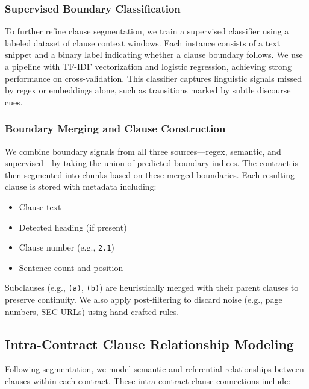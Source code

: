 \documentclass[11pt, oneside]{article}   	%
\begin{document}
\subsubsection*{Supervised Boundary Classification}

To further refine clause segmentation, we train a supervised classifier using a labeled dataset of clause context windows. Each instance consists of a text snippet and a binary label indicating whether a clause boundary follows. We use a pipeline with TF-IDF vectorization and logistic regression, achieving strong performance on cross-validation. This classifier captures linguistic signals missed by regex or embeddings alone, such as transitions marked by subtle discourse cues.

\subsubsection*{Boundary Merging and Clause Construction}

We combine boundary signals from all three sources—regex, semantic, and supervised—by taking the union of predicted boundary indices. The contract is then segmented into chunks based on these merged boundaries. Each resulting clause is stored with metadata including:
\begin{itemize}
    \item Clause text
    \item Detected heading (if present)
    \item Clause number (e.g., \texttt{2.1})
    \item Sentence count and position
\end{itemize}

Subclauses (e.g., \texttt{(a)}, \texttt{(b)}) are heuristically merged with their parent clauses to preserve continuity. We also apply post-filtering to discard noise (e.g., page numbers, SEC URLs) using hand-crafted rules.

\subsection*{Intra-Contract Clause Relationship Modeling}

Following segmentation, we model semantic and referential relationships between clauses within each contract. These intra-contract clause connections include:
\end{document}
